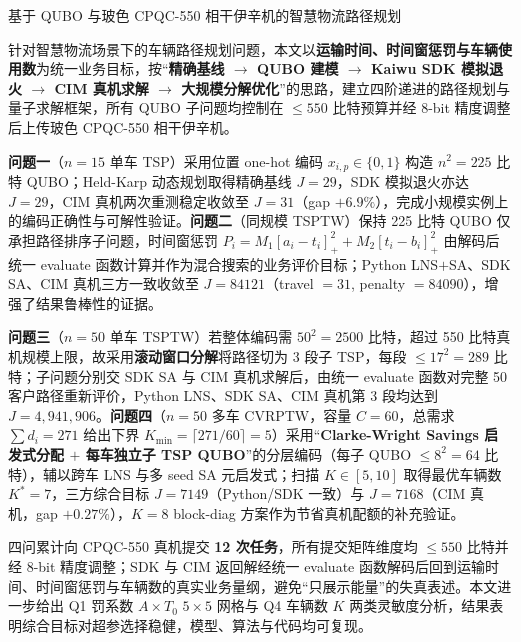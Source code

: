 \documentclass[UTF8,12pt,a4paper]{ctexart}
\begin{document}
\begin{center}
{\fontsize{16pt}{20pt}\selectfont
基于 QUBO 与玻色 CPQC-550 相干伊辛机的智慧物流路径规划}
\end{center}
\vspace{0.6em}

\vspace{0.4em}

针对智慧物流场景下的车辆路径规划问题，本文以\textbf{运输时间、时间窗惩罚与车辆使用数}为统一业务目标，按``\textbf{精确基线 $\rightarrow$ QUBO 建模 $\rightarrow$ Kaiwu SDK 模拟退火 $\rightarrow$ CIM 真机求解 $\rightarrow$ 大规模分解优化}''的思路，建立四阶递进的路径规划与量子求解框架，所有 QUBO 子问题均控制在 $\le 550$ 比特预算并经 8-bit 精度调整后上传玻色 CPQC-550 相干伊辛机。

\textbf{问题一}（$n=15$ 单车 TSP）采用位置 one-hot 编码 $x_{i,p}\!\in\!\{0,1\}$ 构造 $n^{2}=225$ 比特 QUBO；Held-Karp 动态规划取得精确基线 $J=29$，SDK 模拟退火亦达 $J=29$，CIM 真机两次重测稳定收敛至 $J=31$（gap $+6.9\%$），完成小规模实例上的编码正确性与可解性验证。\textbf{问题二}（同规模 TSPTW）保持 225 比特 QUBO 仅承担路径排序子问题，时间窗惩罚 $P_i=M_1[a_i\!-\!t_i]_+^2+M_2[t_i\!-\!b_i]_+^2$ 由解码后统一 evaluate 函数计算并作为混合搜索的业务评价目标；Python LNS$+$SA、SDK SA、CIM 真机三方一致收敛至 $J=84121$（travel $=31$, penalty $=84090$），增强了结果鲁棒性的证据。

\textbf{问题三}（$n=50$ 单车 TSPTW）若整体编码需 $50^{2}=2500$ 比特，超过 550 比特真机规模上限，故采用\textbf{滚动窗口分解}将路径切为 3 段子 TSP，每段 $\le 17^{2}=289$ 比特；子问题分别交 SDK SA 与 CIM 真机求解后，由统一 evaluate 函数对完整 50 客户路径重新评价，Python LNS、SDK SA、CIM 真机第 3 段均达到 $J=4{,}941{,}906$。\textbf{问题四}（$n=50$ 多车 CVRPTW，容量 $C=60$，总需求 $\sum d_i=271$ 给出下界 $K_{\min}=\lceil 271/60\rceil=5$）采用``\textbf{Clarke-Wright Savings 启发式分配 $+$ 每车独立子 TSP QUBO}''的分层编码（每子 QUBO $\le 8^{2}=64$ 比特），辅以跨车 LNS 与多 seed SA 元启发式；扫描 $K\!\in\![5,10]$ 取得最优车辆数 $K^{*}=7$，三方综合目标 $J=7149$（Python/SDK 一致）与 $J=7168$（CIM 真机，gap $+0.27\%$），$K=8$ block-diag 方案作为节省真机配额的补充验证。

四问累计向 CPQC-550 真机提交 \textbf{12 次任务}，所有提交矩阵维度均 $\le 550$ 比特并经 8-bit 精度调整；SDK 与 CIM 返回解经统一 evaluate 函数解码后回到运输时间、时间窗惩罚与车辆数的真实业务量纲，避免``只展示能量''的失真表述。本文进一步给出 Q1 罚系数 $A\!\times\!T_0$ $5\!\times\!5$ 网格与 Q4 车辆数 $K$ 两类灵敏度分析，结果表明综合目标对超参选择稳健，模型、算法与代码均可复现。
\end{document}
